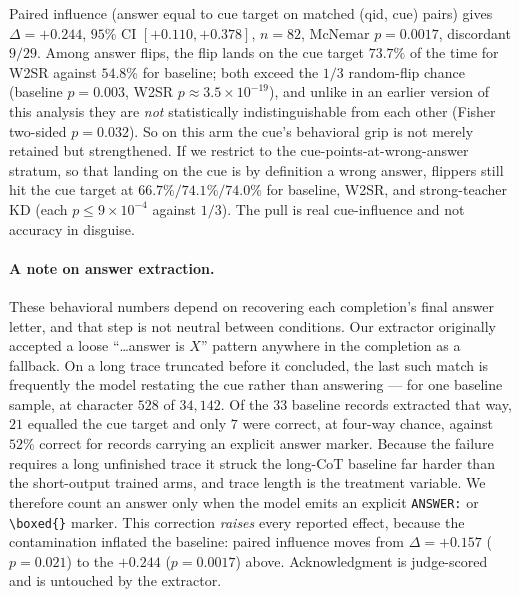 \documentclass{article}
\begin{document}
Paired influence (answer equal to cue target on matched (qid, cue) pairs)
gives $\Delta = +0.244$, $95\%$ CI $[+0.110, +0.378]$, $n = 82$, McNemar
$p = 0.0017$, discordant $9/29$. Among answer flips, the flip lands on the cue
target $73.7\%$ of the time for W2SR against $54.8\%$ for baseline; both exceed
the $1/3$ random-flip chance (baseline $p = 0.003$, W2SR
$p \approx 3.5 \times 10^{-19}$), and unlike in an earlier version of this
analysis they are \emph{not} statistically indistinguishable from each other
(Fisher two-sided $p = 0.032$). So on this arm the cue's behavioral grip is not
merely retained but strengthened. If we restrict to the
cue-points-at-wrong-answer stratum, so that landing on the cue is by definition
a wrong answer, flippers still hit the cue target at $66.7\%/74.1\%/74.0\%$ for
baseline, W2SR, and strong-teacher KD (each $p \le 9 \times 10^{-4}$ against
$1/3$). The pull is real cue-influence and not accuracy in disguise.

\paragraph{A note on answer extraction.} These behavioral numbers depend on
recovering each completion's final answer letter, and that step is not neutral
between conditions. Our extractor originally accepted a loose
``\dots{}answer is $X$'' pattern anywhere in the completion as a fallback. On a
long trace truncated before it concluded, the last such match is frequently the
model restating the cue rather than answering --- for one baseline sample, at
character $528$ of $34{,}142$. Of the $33$ baseline records extracted that way,
$21$ equalled the cue target and only $7$ were correct, at four-way chance,
against $52\%$ correct for records carrying an explicit answer marker. Because
the failure requires a long unfinished trace it struck the long-CoT baseline
far harder than the short-output trained arms, and trace length is the
treatment variable. We therefore count an answer only when the model emits an
explicit \texttt{ANSWER:} or \texttt{\textbackslash boxed\{\}} marker. This
correction \emph{raises} every reported effect, because the contamination
inflated the baseline: paired influence moves from $\Delta = +0.157$
($p = 0.021$) to the $+0.244$ ($p = 0.0017$) above. Acknowledgment is
judge-scored and is untouched by the extractor.
\end{document}
